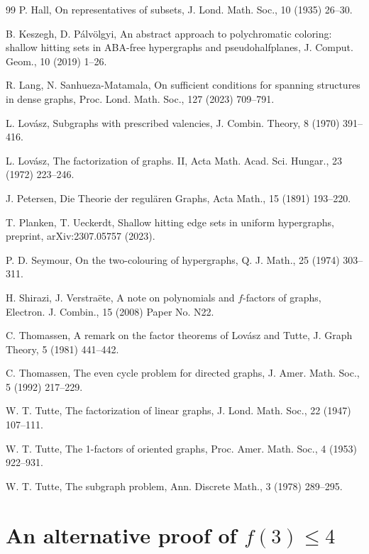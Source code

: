 \documentclass[11pt, a4paper]{article}
\numberwithin{theorem}{section} %
\theoremstyle{remark}
\theoremstyle{definition}
\begin{document}
\begin{thebibliography}{99}
P. Hall,
On representatives of subsets, J. Lond. Math. Soc., 10 (1935) 26--30.

B. Keszegh, D. P{\'a}lv{\"o}lgyi,
An abstract approach to polychromatic coloring: shallow hitting sets in {ABA}-free hypergraphs and pseudohalfplanes, J. Comput. Geom., 10 (2019) 1--26.

R. Lang, N. Sanhueza-Matamala,
On sufficient conditions for spanning structures in dense graphs, Proc. Lond. Math. Soc., 127 (2023) 709--791.

L. Lov{\'a}sz,
Subgraphs with prescribed valencies, J. Combin. Theory, 8 (1970) 391--416.

L. Lov{\'a}sz,
The factorization of graphs. II, Acta Math. Acad. Sci. Hungar., 23 (1972) 223--246.

J. Petersen,
Die Theorie der regul{\"a}ren Graphs, Acta Math., 15 (1891) 193--220.

T. Planken, T. Ueckerdt,
Shallow hitting edge sets in uniform hypergraphs, preprint, arXiv:2307.05757 (2023).

P. D. Seymour,
On the two-colouring of hypergraphs, Q. J. Math., 25 (1974) 303--311.

H. Shirazi, J. Verstra{\"e}te,
A note on polynomials and $f$-factors of graphs, Electron. J. Combin., 15 (2008) Paper No. N22.

C. Thomassen,
A remark on the factor theorems of Lov{\'a}sz and Tutte, J. Graph Theory, 5 (1981) 441--442.

C. Thomassen,
The even cycle problem for directed graphs, J. Amer. Math. Soc., 5 (1992) 217--229.

W. T. Tutte,
The factorization of linear graphs, J. Lond. Math. Soc., 22 (1947) 107--111.

W. T. Tutte,
The 1-factors of oriented graphs, Proc. Amer. Math. Soc., 4 (1953) 922--931.

W. T. Tutte,
The subgraph problem, Ann. Discrete Math., 3 (1978) 289--295.

\end{thebibliography}

\appendix

\section{An alternative proof of \texorpdfstring{$f(3)\leq 4$}{f(3) ≤ 4}}
\end{document}
